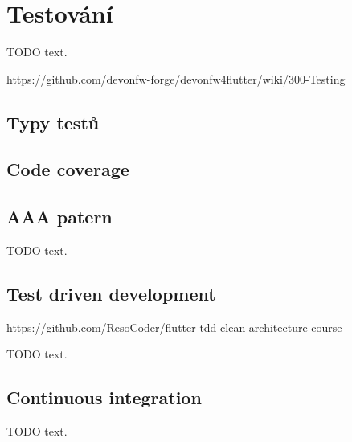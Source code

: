 \section{Testování}

TODO text.

https://github.com/devonfw-forge/devonfw4flutter/wiki/300-Testing


\subsection{Typy testů}


\subsection{Code coverage}


\subsection{AAA patern}

TODO text.

\subsection{Test driven development}

https://github.com/ResoCoder/flutter-tdd-clean-architecture-course

TODO text.

\subsection{Continuous integration}

TODO text.
